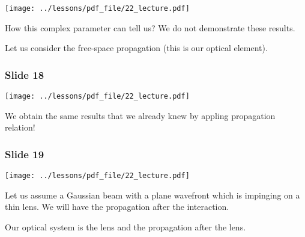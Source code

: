 \documentclass[../main/main.tex]{subfiles}
\begin{document}
\begin{minipage}[]{0.5\linewidth}
\centering
\texttt{[image: ../lessons/pdf\_file/22\_lecture.pdf]}
\end{minipage}
\hspace{0.3cm}\vspace{0.3cm}
\begin{minipage}[c]{0.47\linewidth}

How this complex parameter can tell us? We do not demonstrate these results.

Let us consider the free-space propagation (this is our optical element).

\end{minipage}

\subsubsection*{Slide 18}

\begin{minipage}[]{0.5\linewidth}
\centering
\texttt{[image: ../lessons/pdf\_file/22\_lecture.pdf]}
\end{minipage}
\hspace{0.3cm}\vspace{0.3cm}
\begin{minipage}[c]{0.47\linewidth}

We obtain the same results that we already knew by appling propagation relation!

\end{minipage}

\subsubsection*{Slide 19}

\begin{minipage}[]{0.5\linewidth}
\centering
\texttt{[image: ../lessons/pdf\_file/22\_lecture.pdf]}
\end{minipage}
\hspace{0.3cm}\vspace{0.3cm}
\begin{minipage}[c]{0.47\linewidth}

Let us assume a Gaussian beam with a plane wavefront which is impinging on a thin lens. We will have the propagation after the interaction.

Our optical system is the lens and the propagation after the lens.

\end{minipage}
\end{document}
